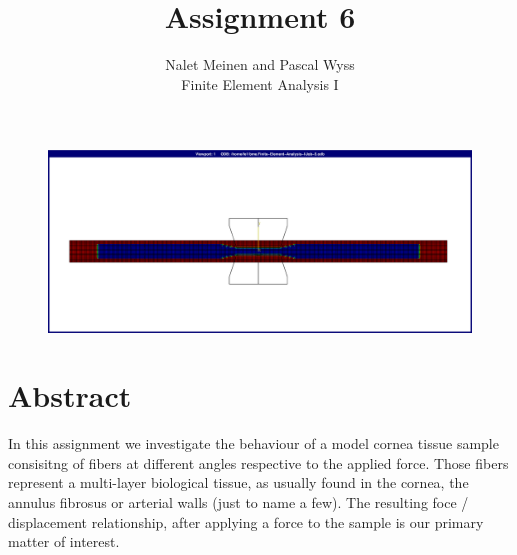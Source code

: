 \documentclass[12pt]{article}
\begin{document}


\title{Assignment 6}%
\author{Nalet Meinen and Pascal Wyss\\ %
Finite Element Analysis I
}
\maketitle

\begin{figure}[!htb]
  \centering
  \vspace*{1cm}
  \includegraphics[trim={2cm 2cm 2cm 2cm},clip,width=1.0\linewidth]{pics/titelbild}
  \label{fig:0}
\end{figure}

\newpage

\section*{Abstract}
In this assignment we investigate the behaviour of a model cornea tissue sample 
consisitng of fibers at different angles
respective to the applied force. Those fibers represent a multi-layer biological
tissue, as usually found in the cornea, the annulus fibrosus or arterial walls (just to name a few).
The resulting foce / displacement relationship, after applying a force to the sample is our primary
matter of interest.

\end{document}
